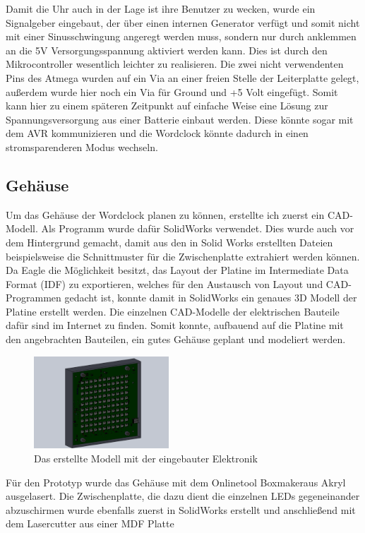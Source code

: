 \documentclass[12pt,journal,compsoc]{IEEEtran}
\begin{document}
Damit die Uhr auch in der Lage ist ihre Benutzer zu wecken, wurde ein Signalgeber eingebaut, der über einen internen Generator verfügt und somit nicht mit einer Sinusschwingung angeregt werden muss, sondern nur durch anklemmen an die 5V Versorgungsspannung aktiviert werden kann. Dies ist durch den Mikrocontroller wesentlich leichter zu realisieren.
Die zwei nicht verwendenten Pins des Atmega wurden auf ein Via an einer freien Stelle der Leiterplatte gelegt, außerdem wurde hier noch ein Via für Ground und +5 Volt eingefügt. Somit kann hier zu einem späteren Zeitpunkt auf einfache Weise eine Lösung zur Spannungsversorgung aus einer Batterie einbaut werden. Diese könnte sogar mit dem AVR kommunizieren und die Wordclock könnte dadurch in einen stromsparenderen Modus wechseln.  


\subsection{Gehäuse}
Um das Gehäuse der Wordclock planen zu können, erstellte ich zuerst ein CAD-Modell. Als Programm wurde dafür SolidWorks verwendet. Dies wurde auch vor dem Hintergrund gemacht, damit aus den in Solid Works erstellten Dateien beispielsweise die Schnittmuster für die Zwischenplatte extrahiert werden können. Da Eagle die Möglichkeit besitzt, das Layout der Platine im Intermediate Data Format  (IDF) zu exportieren, welches für den Austausch von Layout und CAD-Programmen gedacht ist, konnte damit in SolidWorks ein genaues 3D Modell der Platine erstellt werden. Die einzelnen CAD-Modelle der elektrischen Bauteile dafür sind im Internet zu finden. Somit konnte, aufbauend auf die Platine mit den angebrachten Bauteilen, ein gutes Gehäuse geplant und modeliert werden. 
\begin{figure}[h]
	\centering
	\includegraphics[width=0.45\textwidth]{Bilder/SW2}
	\caption{Das erstellte Modell mit der eingebauter Elektronik} 
	\label{fig:SW2}
\end{figure}
Für den Prototyp wurde das Gehäuse mit dem Onlinetool \glqq Boxmaker\grqq aus Akryl ausgelasert. Die Zwischenplatte, die dazu dient die einzelnen LEDs gegeneinander abzuschirmen wurde ebenfalls zuerst in SolidWorks erstellt und anschließend mit dem Lasercutter aus einer MDF Platte 
\end{document}
